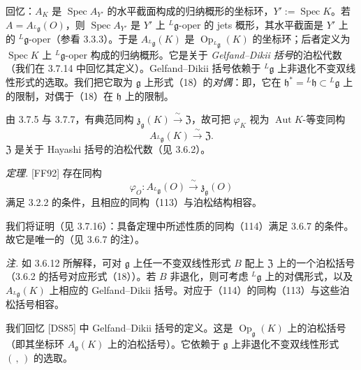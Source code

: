
回忆：$A_K$ 是 $\operatorname{Spec}A_{Y'}$ 的水平截面构成的归纳概形的坐标环，$Y':=\operatorname{Spec}K$。若 $A=A_{{}^{L}\mathfrak{g}}(O)$，则 $\operatorname{Spec}A_{Y'}$ 是 $Y'$ 上 ${}^{L}\mathfrak{g}$-oper 的 jets 概形，其水平截面是 $Y'$ 上的 ${}^{L}\mathfrak{g}$-oper（参看 3.3.3）。于是 $A_{{}^{L}\mathfrak{g}}(K)$ 是 $\operatorname{Op}_{{}^{L}\mathfrak{g}}(K)$ 的坐标环；后者定义为 $\operatorname{Spec}K$ 上 ${}^{L}\mathfrak{g}$-oper 构成的归纳概形。它是关于 \emph{Gelfand--Dikii 括号}的泊松代数（我们在 3.7.14 中回忆其定义）。Gelfand--Dikii 括号依赖于 ${}^{L}\mathfrak{g}$ 上非退化不变双线性形式的选取。我们把它取为 $\mathfrak{g}$ 上形式（18）的\emph{对偶}：即，它在 $\mathfrak{h}^*={}^{L}\mathfrak{h}\subset{}^{L}\mathfrak{g}$ 上的限制，对偶于（18）在 $\mathfrak{h}$ 上的限制。

由 3.7.5 与 3.7.7，有典范同构 $\mathfrak{z}_{\mathfrak{g}}(K)\xrightarrow{\ \sim\ }\mathfrak{Z}$，故可把 $\varphi_K$ 视为 $\operatorname{Aut}K$-等变同构
\begin{equation}\tag{113}
A_{{}^{L}\mathfrak{g}}(K)\xrightarrow{\ \sim\ }\mathfrak{Z}.
\end{equation}
$\mathfrak{Z}$ 是关于 Hayashi 括号的泊松代数（见 3.6.2）。

 \emph{定理.} [FF92] 存在同构
\begin{equation}\tag{114}
\varphi_O:A_{{}^{L}\mathfrak{g}}(O)\xrightarrow{\ \sim\ }\mathfrak{z}_{\mathfrak{g}}(O)
\end{equation}
满足 3.2.2 的条件，且相应的同构（113）与泊松结构相容。

我们将证明（见 3.7.16）：具备定理中所述性质的同构（114）满足 3.6.7 的条件。故它是唯一的（见 3.6.7 的注）。

\emph{注.} 如 3.6.12 所解释，可对 $\mathfrak{g}$ 上任一不变双线性形式 $B$ 配上 $\mathfrak{Z}$ 上的一个泊松括号（3.6.2 的括号对应形式（18））。若 $B$ 非退化，则可考虑 ${}^{L}\mathfrak{g}$ 上的对偶形式，以及 $A_{{}^{L}\mathfrak{g}}(K)$ 上相应的 Gelfand--Dikii 括号。对应于（114）的同构（113）与这些泊松括号相容。


 我们回忆 [DS85] 中 Gelfand--Dikii 括号的定义。这是 $\operatorname{Op}_{\mathfrak{g}}(K)$ 上的泊松括号（即其坐标环 $A_{\mathfrak{g}}(K)$ 上的泊松括号）。它依赖于 $\mathfrak{g}$ 上非退化不变双线性形式 $(\,,\,)$ 的选取。


